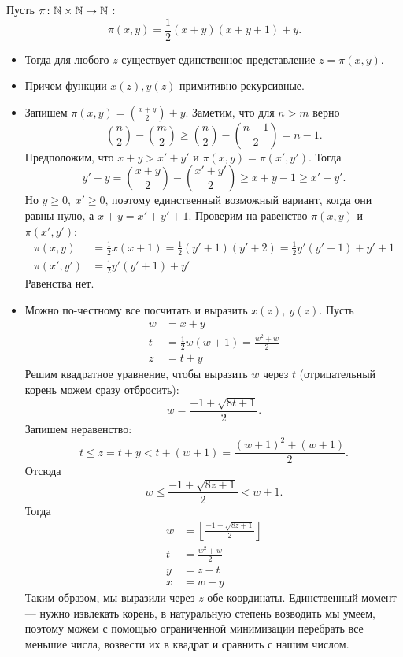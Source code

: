 \begin{thm}
    Пусть $ \pi\colon \mathbb{N} \times \mathbb{N} \to  \mathbb{N}$ :
	\[
		\pi(x, y) = \frac{1}{2}(x+y) (x+y+1)+y
	.\] 
	\begin{itemize}
	\item
	Тогда для любого $ z$ существует единственное представление $ z = \pi(x, y)$.
\item Причем функции $ x(z), y(z)$ примитивно рекурсивные.
	\end{itemize}
\end{thm}
\begin{proof*}
	\begin{itemize}
		\item
	Запишем $ \pi(x, y) = {{x+y}\choose{2}} + y$. Заметим, что для $ n > m$ верно  
	$$ {n \choose 2} - {m \choose 2} \ge {n \choose 2} - {n-1 \choose 2} = n-1.$$
	Предположим, что $ x + y > x' + y'$ и  $ \pi(x, y) = \pi(x',y')$. Тогда
	 \[
		 y' - y = {x+y \choose 2} - {x'+y' \choose 2} \ge x + y - 1 \ge x' + y'
	.\] 
	Но $ y \ge 0, ~ x' \ge 0$,  поэтому единственный возможный вариант, когда они равны нулю, а $ x+y = x'+y'+1$. Проверим на равенство  $ \pi(x, y)$ и $ \pi(x', y')$:
	\[
	\begin{aligned}
		\pi(x, y) & = \frac{1}{2}x(x+1) = \frac{1}{2}(y'+1)(y'+2) = \frac{1}{2}y'(y'+1) + y' + 1 \\
		\pi(x', y') &= \frac{1}{2}y'(y'+1) + y'
	\end{aligned}
	\]
	Равенства нет.
\item  Можно по-честному все посчитать и выразить $ x(z), ~y(z)$.
	Пусть 
	\[
	\begin{aligned}
		w &= x+y \\
		t &= \frac{1}{2}w(w+1) = \frac{w^2+w}{2} \\
		z &= t +y
	\end{aligned}
	\]
	Решим квадратное уравнение, чтобы выразить $ w$ через $ t$ (отрицательный корень можем сразу отбросить):
	\[
		w = \frac{-1 + \sqrt{ 8t + 1}}{2}
	.\] 
	Запишем неравенство:
	\[
		t \le z = t + y < t + (w +1) = \frac{(w+1)^2+(w+1)}{2}
	.\] 
	Отсюда
	\[
		w \le \frac{-1  + \sqrt{ 8z +1} }{2} < w+1
	.\] 
	Тогда 
	\[
	\begin{aligned}
		w &= \left\lfloor \frac{-1 + \sqrt{ 8z+1} }{2} \right\rfloor \\
		t &= \frac{w^2+w}{2} \\
		y &= z - t \\
		x &= w - y
	\end{aligned}
	\]
	Таким образом, мы выразили через $ z$ обе координаты. Единственный момент --- нужно извлекать корень, в натуральную степень возводить мы умеем, поэтому можем с помощью ограниченной минимизации перебрать все меньшие числа, возвести их в квадрат и сравнить с нашим числом.
	\end{itemize}
\end{proof*}


